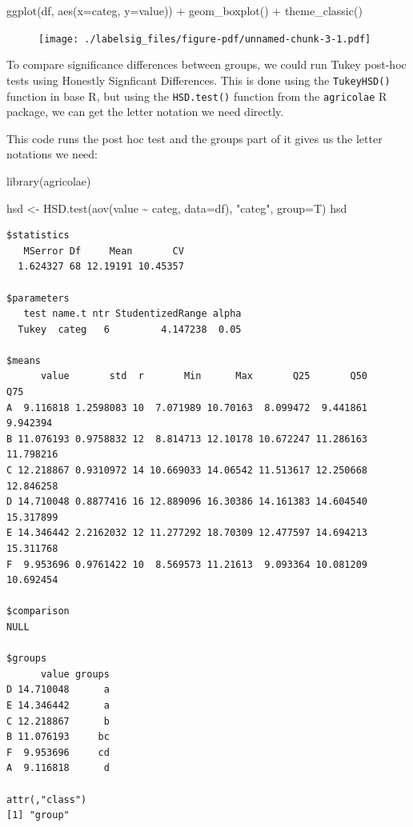 \documentclass[
  letterpaper,
  DIV=11,
  numbers=noendperiod]{scrreprt}
\newenvironment{Shaded}{\begin{snugshade}}{\end{snugshade}}
\newcommand{\AttributeTok}[1]{\textcolor[rgb]{0.40,0.45,0.13}{#1}}
\newcommand{\FunctionTok}[1]{\textcolor[rgb]{0.28,0.35,0.67}{#1}}
\newcommand{\NormalTok}[1]{\textcolor[rgb]{0.00,0.23,0.31}{#1}}
\newcommand{\OtherTok}[1]{\textcolor[rgb]{0.00,0.23,0.31}{#1}}
\newcommand{\SpecialCharTok}[1]{\textcolor[rgb]{0.37,0.37,0.37}{#1}}
\newcommand{\StringTok}[1]{\textcolor[rgb]{0.13,0.47,0.30}{#1}}
\begin{document}
\begin{Shaded}
\begin{Highlighting}[]
\FunctionTok{ggplot}\NormalTok{(df, }\FunctionTok{aes}\NormalTok{(}\AttributeTok{x=}\NormalTok{categ, }\AttributeTok{y=}\NormalTok{value)) }\SpecialCharTok{+}
  \FunctionTok{geom\_boxplot}\NormalTok{() }\SpecialCharTok{+}
  \FunctionTok{theme\_classic}\NormalTok{()}
\end{Highlighting}
\end{Shaded}

\begin{figure}[H]

{\centering \texttt{[image: ./labelsig\_files/figure-pdf/unnamed-chunk-3-1.pdf]}

}

\end{figure}

To compare significance differences between groups, we could run Tukey
post-hoc tests using Honestly Signficant Differences. This is done using
the \texttt{TukeyHSD()} function in base R, but using the
\texttt{HSD.test()} function from the \texttt{agricolae} R package, we
can get the letter notation we need directly.

This code runs the post hoc test and the groups part of it gives us the
letter notations we need:

\begin{Shaded}
\begin{Highlighting}[]
\FunctionTok{library}\NormalTok{(agricolae)}

\NormalTok{hsd }\OtherTok{\textless{}{-}} \FunctionTok{HSD.test}\NormalTok{(}\FunctionTok{aov}\NormalTok{(value }\SpecialCharTok{\textasciitilde{}}\NormalTok{ categ, }\AttributeTok{data=}\NormalTok{df), }\StringTok{"categ"}\NormalTok{, }\AttributeTok{group=}\NormalTok{T)}
\NormalTok{hsd}
\end{Highlighting}
\end{Shaded}

\begin{verbatim}
$statistics
   MSerror Df     Mean       CV
  1.624327 68 12.19191 10.45357

$parameters
   test name.t ntr StudentizedRange alpha
  Tukey  categ   6         4.147238  0.05

$means
      value       std  r       Min      Max       Q25       Q50       Q75
A  9.116818 1.2598083 10  7.071989 10.70163  8.099472  9.441861  9.942394
B 11.076193 0.9758832 12  8.814713 12.10178 10.672247 11.286163 11.798216
C 12.218867 0.9310972 14 10.669033 14.06542 11.513617 12.250668 12.846258
D 14.710048 0.8877416 16 12.889096 16.30386 14.161383 14.604540 15.317899
E 14.346442 2.2162032 12 11.277292 18.70309 12.477597 14.694213 15.311768
F  9.953696 0.9761422 10  8.569573 11.21613  9.093364 10.081209 10.692454

$comparison
NULL

$groups
      value groups
D 14.710048      a
E 14.346442      a
C 12.218867      b
B 11.076193     bc
F  9.953696     cd
A  9.116818      d

attr(,"class")
[1] "group"
\end{verbatim}
\end{document}
